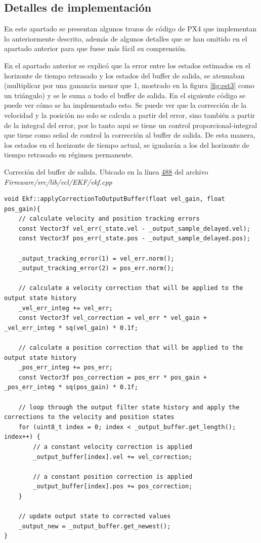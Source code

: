 



\subsection{Detalles de implementación}
En este apartado se presentan algunos trozos de código de PX4 que implementan lo anteriormente descrito, además de algunos detalles que se han omitido en el apartado anterior para que fuese más fácil su comprensión.

En el apartado anterior se explicó que la error entre los estados estimados en el horizonte de tiempo retrasado y los estados del buffer de salida, se atenuaban (multiplicar por una ganancia menor que 1, mostrado en la figura \ref{fig:est3} como un triángulo) y se le suma a todo el buffer de salida. En el siguiente código se puede ver cómo se ha implementado esto. Se puede ver que la corrección de la velocidad y la posición no solo se calcula a partir del error, sino también a partir de la integral del error, por lo tanto aqui se tiene un control proporcional-integral que tiene como señal de control la corrección al buffer de salida. De esta manera, los estados en el horizonte de tiempo actual, se igualarán a los del horizonte de tiempo retrasado en régimen permanente. 

\begin{codigo}{Correción del buffer de salida. Ubicado en  la línea \href{https://github.com/PX4/PX4-ECL/blob/ec934908900b23ee273d1a9f82364b7b38423200/EKF/ekf.cpp\#L488}{488} del archivo \textit{Firmware/src/lib/ecl/EKF/ekf.cpp}}
\begin{verbatim}
void Ekf::applyCorrectionToOutputBuffer(float vel_gain, float pos_gain){
	// calculate velocity and position tracking errors
	const Vector3f vel_err(_state.vel - _output_sample_delayed.vel);
	const Vector3f pos_err(_state.pos - _output_sample_delayed.pos);

	_output_tracking_error(1) = vel_err.norm();
	_output_tracking_error(2) = pos_err.norm();

	// calculate a velocity correction that will be applied to the output state history
	_vel_err_integ += vel_err;
	const Vector3f vel_correction = vel_err * vel_gain + _vel_err_integ * sq(vel_gain) * 0.1f;

	// calculate a position correction that will be applied to the output state history
	_pos_err_integ += pos_err;
	const Vector3f pos_correction = pos_err * pos_gain + _pos_err_integ * sq(pos_gain) * 0.1f;

	// loop through the output filter state history and apply the corrections to the velocity and position states
	for (uint8_t index = 0; index < _output_buffer.get_length(); index++) {
		// a constant velocity correction is applied
		_output_buffer[index].vel += vel_correction;

		// a constant position correction is applied
		_output_buffer[index].pos += pos_correction;
	}

	// update output state to corrected values
	_output_new = _output_buffer.get_newest();
}
\end{verbatim}
\end{codigo} 

